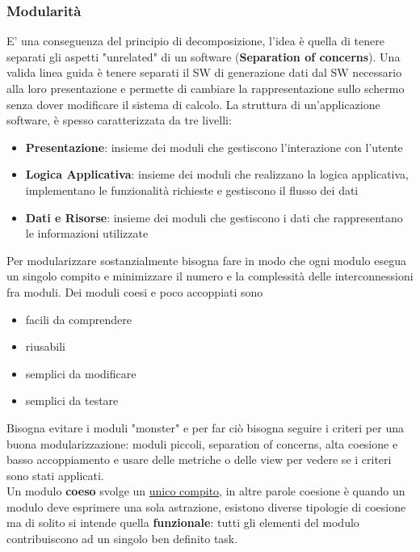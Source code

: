 \documentclass[12pt, a4paper]{report}
\begin{document}
\subsubsection{Modularità}
E' una conseguenza del principio di decomposizione, l'idea è quella di tenere separati gli aspetti "unrelated" di un software (\textbf{Separation of concerns}). Una valida linea guida è tenere separati il SW di generazione dati dal SW necessario alla loro presentazione e permette di cambiare la rappresentazione sullo schermo senza dover modificare il sistema di calcolo. La struttura di un'applicazione software, è spesso caratterizzata da tre livelli:
\begin{itemize}
    \item \textbf{Presentazione}: insieme dei moduli che gestiscono l'interazione con l'utente
    \item \textbf{Logica Applicativa}: insieme dei moduli che realizzano la logica applicativa, implementano le funzionalità richieste e gestiscono il flusso dei dati
    \item \textbf{Dati e Risorse}: insieme dei moduli che gestiscono i dati che rappresentano le informazioni utilizzate
\end{itemize}
Per modularizzare sostanzialmente bisogna fare in modo che ogni modulo esegua un singolo compito e minimizzare il numero e la complessità delle interconnessioni fra moduli. Dei moduli coesi e poco accoppiati sono\begin{itemize}
    \item facili da comprendere
    \item riusabili
    \item semplici da modificare
    \item semplici da testare
\end{itemize}
Bisogna evitare i moduli "monster" e per far ciò bisogna seguire i criteri per una buona modularizzazione: moduli piccoli, separation of concerns, alta coesione e basso accoppiamento e usare delle metriche o delle view per vedere se i criteri sono stati applicati.\\
Un modulo \textbf{coeso} svolge un \underline{unico compito}, in altre parole coesione è quando un modulo deve esprimere una sola astrazione, esistono diverse tipologie di coesione ma di solito si intende quella \textbf{funzionale}: tutti gli elementi del modulo contribuiscono ad un singolo ben definito task.\\
\end{document}

